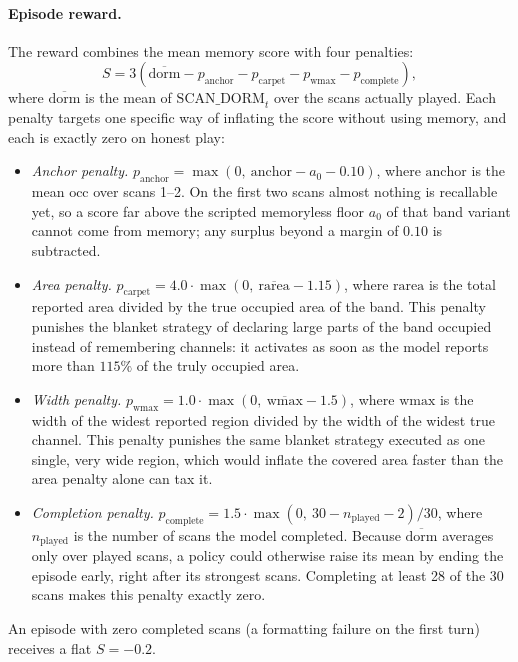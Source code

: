 \documentclass[11pt]{article}
\newcommand{\occ}{\ensuremath{\mathrm{occ}}}
\begin{document}
\paragraph{Episode reward.}
The reward combines the mean memory score with four penalties:
\begin{equation}
\label{eq:reward}
S = 3\left(\overline{\mathrm{dorm}}
 - p_{\mathrm{anchor}} - p_{\mathrm{carpet}} - p_{\mathrm{wmax}}
 - p_{\mathrm{complete}}\right),
\end{equation}
where $\overline{\mathrm{dorm}}$ is the mean of $\mathrm{SCAN\_DORM}_t$ over the
scans actually played. Each penalty targets one specific way of inflating the score
without using memory, and each is exactly zero on honest play:
\begin{itemize}
\item \emph{Anchor penalty.}
$p_{\mathrm{anchor}} = \max(0,\ \mathrm{anchor} - a_0 - 0.10)$, where
$\mathrm{anchor}$ is the mean $\occ$ over scans 1--2. On the first two scans almost
nothing is recallable yet, so a score far above the scripted memoryless floor
$a_0$ of that band variant cannot come from memory; any surplus beyond a margin of
$0.10$ is subtracted.
\item \emph{Area penalty.}
$p_{\mathrm{carpet}} = 4.0 \cdot \max(0,\ \overline{\mathrm{rarea}} - 1.15)$, where
$\mathrm{rarea}$ is the total reported area divided by the true occupied area of
the band. This penalty punishes the blanket strategy of declaring large parts of
the band occupied instead of remembering channels: it activates as soon as the
model reports more than $115\%$ of the truly occupied area.
\item \emph{Width penalty.}
$p_{\mathrm{wmax}} = 1.0 \cdot \max(0,\ \overline{\mathrm{wmax}} - 1.5)$, where
$\mathrm{wmax}$ is the width of the widest reported region divided by the width of
the widest true channel. This penalty punishes the same blanket strategy executed
as one single, very wide region, which would inflate the covered area faster than
the area penalty alone can tax it.
\item \emph{Completion penalty.}
$p_{\mathrm{complete}} = 1.5 \cdot \max(0,\ 30 - n_{\mathrm{played}} - 2)/30$,
where $n_{\mathrm{played}}$ is the number of scans the model completed. Because
$\overline{\mathrm{dorm}}$ averages only over played scans, a policy could
otherwise raise its mean by ending the episode early, right after its strongest
scans. Completing at least 28 of the 30 scans makes this penalty exactly zero.
\end{itemize}
An episode with zero completed scans (a formatting failure on the first turn)
receives a flat $S = -0.2$.
\end{document}

